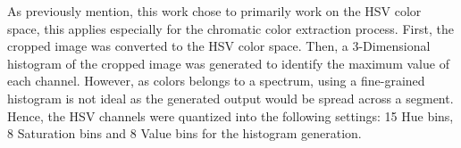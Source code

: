 As previously mention, this work chose to primarily work on the HSV color space, this applies especially for the chromatic color extraction process. First, the cropped image was converted to the HSV color space. Then, a 3-Dimensional histogram of the cropped image was generated to identify the maximum value of each channel. However, as colors belongs to a spectrum, using a fine-grained histogram is not ideal as the generated output would be spread across a segment. Hence, the HSV channels were quantized into the following settings: 15 Hue bins, 8 Saturation bins and 8 Value bins for the histogram generation. 






